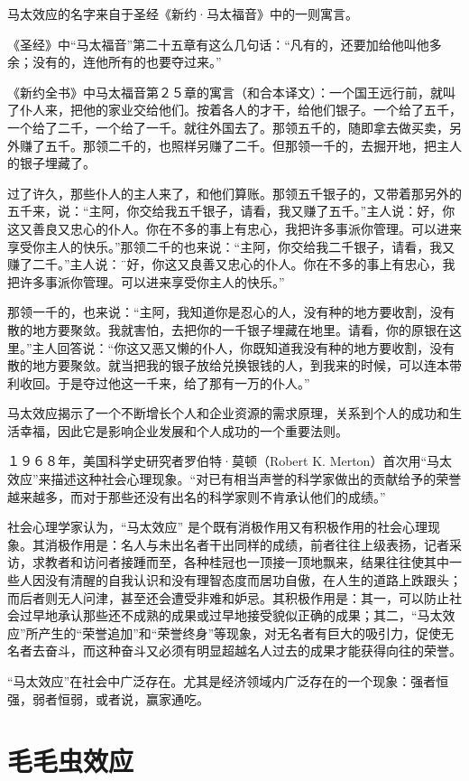 \documentclass[11pt]{ctexart}
\begin{document}
马太效应的名字来自于圣经《新约·马太福音》中的一则寓言。

《圣经》中“马太福音”第二十五章有这么几句话：“凡有的，还要加给他叫他多余；没有的，连他所有的也要夺过来。”

《新约全书》中马太福音第２５章的寓言（和合本译文）：一个国王远行前，就叫了仆人来，把他的家业交给他们。按着各人的才干，给他们银子。一个给了五千，一个给了二千，一个给了一千。就往外国去了。那领五千的，随即拿去做买卖，另外赚了五千。那领二千的，也照样另赚了二千。但那领一千的，去掘开地，把主人的银子埋藏了。

过了许久，那些仆人的主人来了，和他们算账。那领五千银子的，又带着那另外的五千来，说：“主阿，你交给我五千银子，请看，我又赚了五千。”主人说：好，你这又善良又忠心的仆人。你在不多的事上有忠心，我把许多事派你管理。可以进来享受你主人的快乐。”那领二千的也来说：“主阿，你交给我二千银子，请看，我又赚了二千。”主人说：¨好，你这又良善又忠心的仆人。你在不多的事上有忠心，我把许多事派你管理。可以进来享受你主人的快乐。”

那领一千的，也来说：“主阿，我知道你是忍心的人，没有种的地方要收割，没有散的地方要聚敛。我就害怕，去把你的一千银子埋藏在地里。请看，你的原银在这里。”主人回答说：“你这又恶又懒的仆人，你既知道我没有种的地方要收割，没有散的地方要聚敛。就当把我的银子放给兑换银钱的人，到我来的时候，可以连本带利收回。于是夺过他这一千来，给了那有一万的仆人。”

马太效应揭示了一个不断增长个人和企业资源的需求原理，关系到个人的成功和生活幸福，因此它是影响企业发展和个人成功的一个重要法则。

１９６８年，美国科学史研究者罗伯特·莫顿（Robert K. Merton）首次用“马太效应”来描述这种社会心理现象。“对已有相当声誉的科学家做出的贡献给予的荣誉越来越多，而对于那些还没有出名的科学家则不肯承认他们的成绩。”

社会心理学家认为，“马太效应” 是个既有消极作用又有积极作用的社会心理现象。其消极作用是：名人与未出名者干出同样的成绩，前者往往上级表扬，记者采访，求教者和访问者接踵而至，各种桂冠也一顶接一顶地飘来，结果往往使其中一些人因没有清醒的自我认识和没有理智态度而居功自傲，在人生的道路上跌跟头；而后者则无人问津，甚至还会遭受非难和妒忌。其积极作用是：其一，可以防止社会过早地承认那些还不成熟的成果或过早地接受貌似正确的成果；其二，“马太效应”所产生的“荣誉追加”和“荣誉终身”等现象，对无名者有巨大的吸引力，促使无名者去奋斗，而这种奋斗又必须有明显超越名人过去的成果才能获得向往的荣誉。

“马太效应”在社会中广泛存在。尤其是经济领域内广泛存在的一个现象：强者恒强，弱者恒弱，或者说，赢家通吃。
\section{毛毛虫效应}
\label{sec-65}
\end{document}
